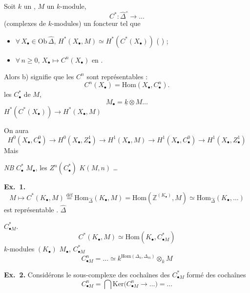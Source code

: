 \documentclass[11pt,a4paper]{article}
\begin{document}
Soit $k$ un  , $M$ un $k$-module,
\[
  C^{*} : \widehat{\Delta}^{\circ} \longrightarrow \ldots
\]
(complexes \ill{} de $k$-modules) un foncteur \ill{} tel que
\begin{itemize}
  \item[a)] $\forall\, X_\bullet \in \mathrm{Ob}\,\widehat{\Delta}$, $H^{*}(X_\bullet, M) \simeq H^{*}(C^{*}(X_\bullet))$
  ( \ill{}) ;
  \item[b)] $\forall\, n \geq 0$, $X_\bullet \mapsto C^{n}(X_\bullet)$  \ill{} en \ill{}.
\end{itemize}
Alors b) signifie que les $C^{n}$ sont représentables :
\[
  C^{n}(X_\bullet) = \mathrm{Hom}(X_\bullet, C^{n}_\bullet) .
\]
\ill{} les $C^{*}_\bullet$   de $M$, \ill{}
\[
  M_\bullet = \underline{k} \otimes M \ldots
\]
\ill{} $H^{*}(C^{*}(X_\bullet)) \to H^{*}(X_\bullet, M)$ \ill{}

\ill{} On aura
\[
  H^{0}(X_\bullet, C^{0}_\bullet) \to H^{0}(X_\bullet, Z^{1}_\bullet) \to H^{1}(X_\bullet, M)
  \to H^{1}(X_\bullet, C^{0}_\bullet) \to H^{1}(X_\bullet, Z^{1}_\bullet)
\]
Mais \ill{} \ill{}

\emph{NB} \ill{} $C^{*}_\bullet$ \ill{} $M_\bullet$, les $Z^{n}(C^{*}_\bullet)$ \ill{} $K(M, n)$ …


\textbf{Ex.~1.} \ill{}
\[
  M \mapsto C^{*}(K_\bullet, M) \overset{\text{déf}}{=} \mathrm{Hom}_{\widehat{\Delta}}(K_\bullet, M)
  = \mathrm{Hom}(\mathbb{Z}^{(K_\bullet)}, M) \simeq \mathrm{Hom}_{\widehat{\Delta}}(K_\bullet, \ldots)
\]
est représentable \ill{}. \ill{} $\widehat{\Delta}$ \ill{}

\ill{} $C^{*}_{\bullet M}$. \ill{}
\[
  C^{*}(K_\bullet, M) \simeq \mathrm{Hom}(K_\bullet, C^{*}_{\bullet M})
\]
\ill{} $k$-modules \ill{} $(K_\bullet)$ \ill{} $M_\bullet$, \ill{} $C^{*}_{\bullet M}$ \ill{} \ill{}
\[
  C^{n}_{\bullet M} = \ldots \simeq k^{\mathrm{Hom}(\Delta_n, \Delta_m)} \otimes_k M
\]

\textbf{Ex.~2.} Considérons le sous-complexe \ill{} des cochaînes \ill{} des $C^{*}_{\bullet M}$
formé des cochaînes \ill{}
\[
  C^{n}_{\bullet M} = \bigcap \mathrm{Ker}\bigl(C^{n}_{\bullet M} \to \ldots\bigr) = \ldots
\]
\end{document}
